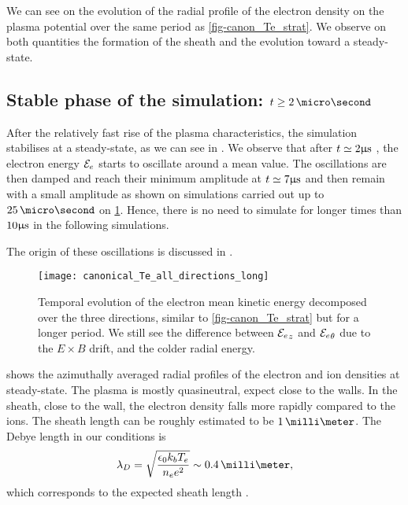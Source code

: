   We can see on  the evolution of the radial profile of the electron density on the plasma potential over the same period as \cref{fig-canon_Te_strat}.
  We observe on both quantities the formation of the sheath and the evolution toward a steady-state.
  
  \subsection{Stable phase of the simulation\string: \texorpdfstring{$t \geq 2\,\micro\second$}{t > 2 microseconds}  }
  \label{subsec-stablephase}
  After the relatively fast rise of the plasma characteristics, the simulation stabilises at a steady-state, as we can see in .
  We observe that after $t\simeq2\mathrm{\upmu s}$ , the electron energy ${\mathcal{E}_e}$ starts to oscillate around a mean value.
  The oscillations are then damped and reach their minimum amplitude at  $t\simeq 7\mathrm{\upmu s}$ and then remain with a small amplitude as shown on simulations carried out up to $25\,\micro\second$ on \cref{fig-canon_Te_all}.
  Hence, there is no need to simulate for longer times than $10\mathrm{\upmu s}$ in the following simulations.
  
  The origin of these oscillations is discussed in .
  
  
  \begin{figure}[hbt]
    \centering
    \texttt{[image: canonical\_Te\_all\_directions\_long]}
    \caption{Temporal evolution of the electron mean kinetic energy decomposed over the three directions, similar to \cref{fig-canon_Te_strat} but for a longer period. We still see the difference between ${\mathcal{E}_e}_z$ and ${\mathcal{E}_e}_{\theta}$ due to the $E\times B$ drift, and the colder radial energy.}
    \label{fig-canon_Te_all}
  \end{figure}
  

   shows the azimuthally averaged radial profiles of the electron and ion densities  at steady-state.
  The plasma is mostly quasineutral, expect close to the walls.
  In the sheath, close to the wall, the electron density falls more rapidly compared to the ions.
  The sheath length can be roughly estimated to be $1\,\milli\meter$.
  The Debye length in our conditions is
  \begin{equation} \label{eq-debye}
    \lambda_D = \sqrt{\frac{\epsilon_0 k_b T_e}{n_e e^2}} \sim 0.4\,\milli\meter,
  \end{equation}
  which corresponds to the expected sheath length \citep{chabert2014}.
  
